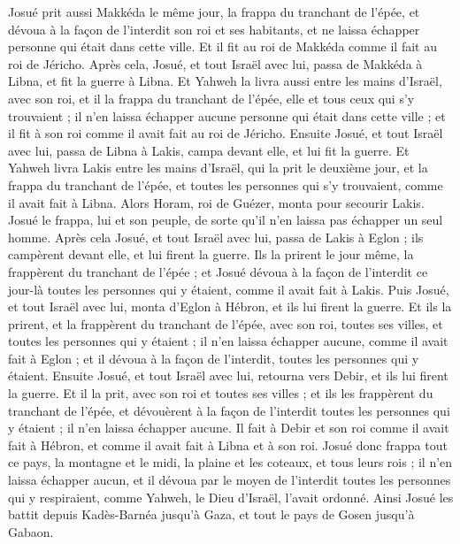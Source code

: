 \begin{multicols}{2}
Josué prit aussi Makkéda le même jour, la frappa du tranchant de l'épée, et dévoua à la façon de l'interdit son roi et ses habitants, et ne laissa échapper personne qui était dans cette ville. Et il fit au roi de Makkéda comme il fait au roi de Jéricho.
Après cela, Josué, et tout Israël avec lui, passa de Makkéda à Libna, et fit la guerre à Libna.
Et Yahweh la livra aussi entre les mains d'Israël, avec son roi, et il la frappa du tranchant de l'épée, elle et tous ceux qui s'y trouvaient ; il n'en laissa échapper aucune personne qui était dans cette ville ; et il fit à son roi comme il avait fait au roi de Jéricho.
Ensuite Josué, et tout Israël avec lui, passa de Libna à Lakis, campa devant elle, et lui fit la guerre.
Et Yahweh livra Lakis entre les mains d'Israël, qui la prit le deuxième jour, et la frappa du tranchant de l'épée, et toutes les personnes qui s'y trouvaient, comme il avait fait à Libna.
Alors Horam, roi de Guézer, monta pour secourir Lakis. Josué le frappa, lui et son peuple, de sorte qu'il n'en laissa pas échapper un seul homme.
Après cela Josué, et tout Israël avec lui, passa de Lakis à Eglon ; ils campèrent devant elle, et lui firent la guerre.
Ils la prirent le jour même, la frappèrent du tranchant de l'épée ; et Josué dévoua à la façon de l'interdit ce jour-là toutes les personnes qui y étaient, comme il avait fait à Lakis.
Puis Josué, et tout Israël avec lui, monta d'Eglon à Hébron, et ils lui firent la guerre.
Et ils la prirent, et la frappèrent du tranchant de l'épée, avec son roi, toutes ses villes, et toutes les personnes qui y étaient ; il n'en laissa échapper aucune, comme il avait fait à Eglon ; et il dévoua à la façon de l'interdit, toutes les personnes qui y étaient.
Ensuite Josué, et tout Israël avec lui, retourna vers Debir, et ils lui firent la guerre.
Et il la prit, avec son roi et toutes ses villes ; et ils les frappèrent du tranchant de l'épée, et dévouèrent à la façon de l'interdit toutes les personnes qui y étaient ; il n'en laissa échapper aucune. Il fait à Debir et son roi comme il avait fait à Hébron, et comme il avait fait à Libna et à son roi.
Josué donc frappa tout ce pays, la montagne et le midi, la plaine et les coteaux, et tous leurs rois ; il n'en laissa échapper aucun, et il dévoua par le moyen de l'interdit toutes les personnes qui y respiraient, comme Yahweh, le Dieu d'Israël, l'avait ordonné.
Ainsi Josué les battit depuis Kadès-Barnéa jusqu'à Gaza, et tout le pays de Gosen jusqu'à Gabaon.

\end{multicols}
